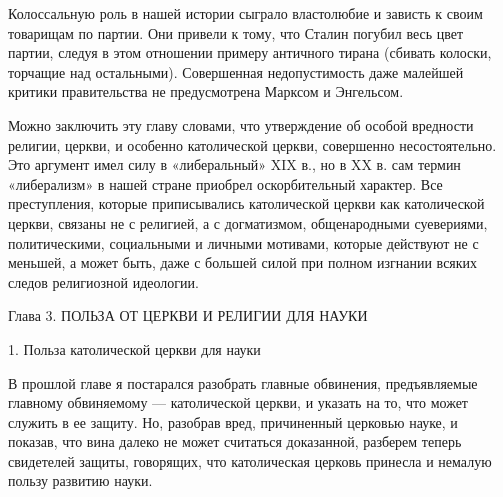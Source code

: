 Колоссальную роль в нашей истории сыграло властолюбие и зависть к своим
товарищам по партии. Они привели к тому, что Сталин погубил весь цвет
партии, следуя в этом отношении примеру античного тирана (сбивать колоски,
торчащие над остальными). Совершенная недопустимость даже малейшей критики
правительства не предусмотрена Марксом и Энгельсом.

Можно заключить эту главу словами, что утверждение об особой вредности
религии, церкви, и особенно католической церкви, совершенно несостоятельно. Это
аргумент имел силу в «либеральный» XIX в., но в XX в. сам термин
«либерализм» в нашей стране приобрел оскорбительный характер. Все
преступления, которые приписывались католической церкви как католической
церкви, связаны не с религией, а с догматизмом, общенародными суевериями,
политическими, социальными и личными мотивами, которые действуют не с
меньшей, а может быть, даже с большей силой при полном изгнании всяких
следов религиозной идеологии.

Глава 3. ПОЛЬЗА ОТ ЦЕРКВИ И РЕЛИГИИ ДЛЯ НАУКИ

1. Польза католической церкви для
науки

В прошлой главе я постарался разобрать главные обвинения, предъявляемые
главному обвиняемому --- католической церкви, и указать на то, что может
служить в ее защиту. Но, разобрав вред, причиненный церковью науке, и
показав, что вина далеко не может считаться доказанной, разберем теперь
свидетелей защиты, говорящих, что католическая церковь принесла и немалую
пользу развитию науки.

